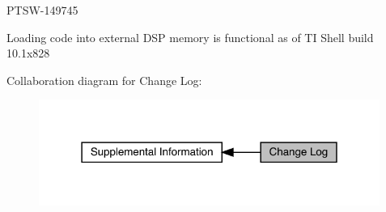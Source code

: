 \begin{DoxyItemize}
\item P\+T\+S\+W-\/149745 
\begin{DoxyItemize}
\item Loading code into external D\+SP memory is functional as of TI Shell build 10.\+1x828 
\end{DoxyItemize}
\end{DoxyItemize}Collaboration diagram for Change Log\+:
\nopagebreak
\begin{figure}[H]
\begin{center}
\leavevmode
\includegraphics[width=316pt]{a00847}
\end{center}
\end{figure}
